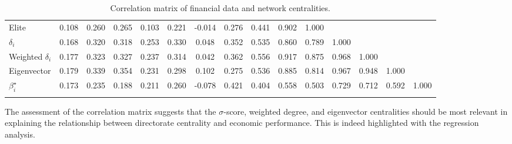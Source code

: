 \begin{table}[t!]
\begin{onehalfspace}
{\begin{tabular}{@{\extracolsep{5pt}} lcccccccccccccc}
Elite                                                         & 0.108  & 0.260                                                         & 0.265  & 0.103    & 0.221                                                       & -0.014 & 0.276     & 0.441 & 0.902        & 1.000 &              &                                                                 &             &             \\
$\delta_{i}$                                                  & 0.168  & 0.320                                                         & 0.318  & 0.253    & 0.330                                                       & 0.048  & 0.352     & 0.535 & 0.860        & 0.789 & 1.000        &                                                                 &             &             \\
Weighted $\delta_{i}$                                         & 0.177  & 0.323                                                         & 0.327  & 0.237    & 0.314                                                       & 0.042  & 0.362     & 0.556 & 0.917        & 0.875 & 0.968        & 1.000                                                           &             &             \\
Eigenvector                                                   & 0.179  & 0.339                                                         & 0.354  & 0.231    & 0.298                                                       & 0.102  & 0.275     & 0.536 & 0.885        & 0.814 & 0.967        & 0.948                                                           & 1.000       &             \\
$\beta^{\star}_{i}$                                                   & 0.173  & 0.235                                                         & 0.188  & 0.211    & 0.260                                                       & -0.078 & 0.421     & 0.404 & 0.558        & 0.503 & 0.729        & 0.712                                                           & 0.592       & 1.000       \\
\hline \\[-1.8ex]
\end{tabular}
}
\caption{Correlation matrix of financial data and network centralities.}
\label{fin-corr}
\end{onehalfspace}
\end{table}


The assessment of the correlation matrix suggests that the $\sigma$-score, weighted degree, and eigenvector centralities should be most relevant in explaining the relationship between directorate centrality and economic performance. This is indeed highlighted with the regression analysis.

